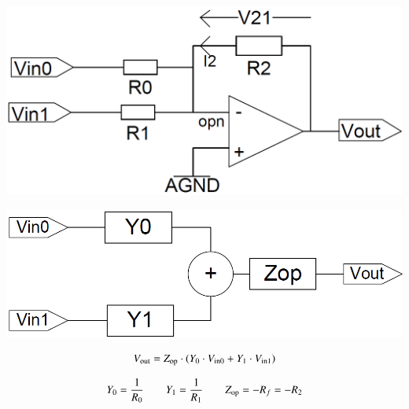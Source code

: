
\begin{minipage}[c]{0.4\columnwidth}
    \includegraphics[width=\columnwidth]{images/summierender_verstaerker.png}
\end{minipage}
\hfill
\begin{minipage}[c]{0.58\columnwidth}
    \begin{center}
        \includegraphics[width=0.8\columnwidth]{images/summierender_verstaerker_sfd.png}
    \end{center}
    $$ V_{\rm out} = Z_{\rm op} \cdot (Y_0 \cdot V_{\rm in0} + Y_1 \cdot V_{\rm in1}) $$
\end{minipage}

$$ Y_0 = \frac{1}{R_0} \qquad Y_1 = \frac{1}{R_1} \qquad Z_{\rm op} = - R_f = -R_2$$



